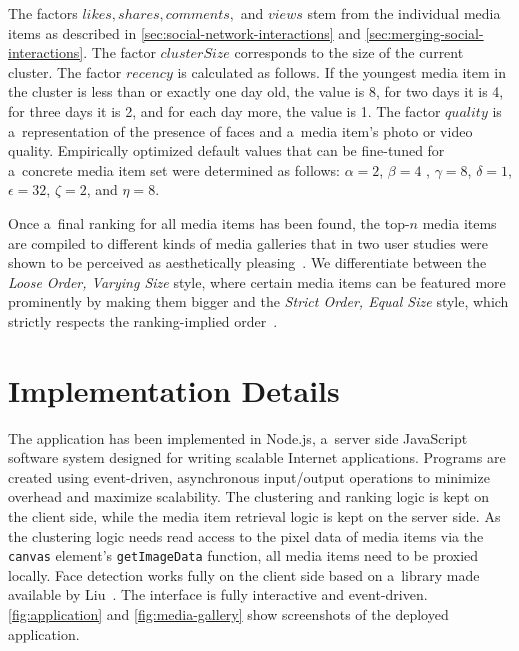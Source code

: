 \documentclass{sig-alt-release2}
\begin{document}
The factors $ \mathit{likes}, \mathit{shares}, \mathit{comments},$ and $ \mathit{views} $
stem from the individual media items as described in \autoref{sec:social-network-interactions}
and \autoref{sec:merging-social-interactions}.
The factor $ \mathit{clusterSize} $ corresponds to the size of the current cluster. 
The factor $ \mathit{recency} $ is calculated as follows.
If the youngest media item in the cluster is less than or exactly one day old,
the value is 8, for two days it is 4, for three days it is 2,
and for each day more, the value is 1.
The factor $ \mathit{quality} $ is a~representation of the
presence of faces and a~media item’s photo or video quality.
Empirically optimized default values
that can be fine-tuned for a~concrete media item set
were determined as follows:
$ \alpha = 2 $, $ \beta = 4 $ , $ \gamma = 8 $, $ \delta = 1 $,
$ \epsilon = 32 $, $ \zeta = 2 $, and $ \eta = 8 $.

Once a~final ranking for all media items has been found,
the top-$n$ media items are compiled to different kinds of media galleries
that in two user studies were shown to be perceived as
aesthetically pleasing~\cite{steiner2013mediagalleries}.
We differentiate between the \emph{Loose Order, Varying Size} style,
where certain media items can be featured more prominently by making them bigger
and the \emph{Strict Order, Equal Size} style,
which strictly respects the ranking-implied order~\cite{steiner2013mediagalleries}.

\section{Implementation Details}

The application has been implemented in Node.js,
a~server side JavaScript software system
designed for writing scalable Internet applications.
Programs are created using event-driven, asynchronous input/output operations
to minimize overhead and maximize scalability.
The clustering and ranking logic is kept on the client side,
while the media item retrieval logic is kept on the server side.
As the clustering logic needs read access to the pixel data of media items via
the \texttt{canvas} element’s \texttt{getImageData} function,
all media items need to be proxied locally.
Face detection works fully on the client side based on a~library
made available by Liu~\cite{liu2012facedetection}.
The interface is fully interactive and event-driven.
\autoref{fig:application} and \autoref{fig:media-gallery} show screenshots
of the deployed application.
\end{document}

